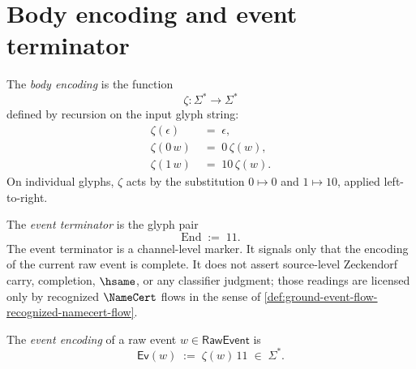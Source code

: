 \section{Body encoding and event terminator}
\label{sec:channel-encoding-body-and-terminator}

\begin{definition}
\label{def:channel-encoding-body-encoding}
The \emph{body encoding} is the function
$$
  \zeta \colon \Sigma^{*} \longrightarrow \Sigma^{*}
$$
defined by recursion on the input glyph string:
$$
\begin{aligned}
  \zeta(\epsilon) &\;=\; \epsilon, \\
  \zeta(0\, w) &\;=\; 0\,\zeta(w), \\
  \zeta(1\, w) &\;=\; 10\,\zeta(w).
\end{aligned}
$$
On individual glyphs, $\zeta$ acts by the substitution $0 \mapsto 0$ and $1 \mapsto 10$, applied left-to-right.
\end{definition}

\begin{definition}
\label{def:channel-encoding-event-terminator}
The \emph{event terminator} is the glyph pair
$$
  \mathrm{End} \;:=\; 11.
$$
The event terminator is a channel-level marker. It signals only that the encoding of the current raw event is complete. It does not assert source-level Zeckendorf carry, completion, $\hsame$, or any classifier judgment; those readings are licensed only by recognized $\NameCert$ flows in the sense of \autoref{def:ground-event-flow-recognized-namecert-flow}.
\end{definition}

\begin{definition}
\label{def:channel-encoding-event-encoding}
The \emph{event encoding} of a raw event $w \in \mathsf{RawEvent}$ is
$$
  \mathsf{Ev}(w) \;:=\; \zeta(w)\,11 \;\in\; \Sigma^{*}.
$$
\end{definition}


